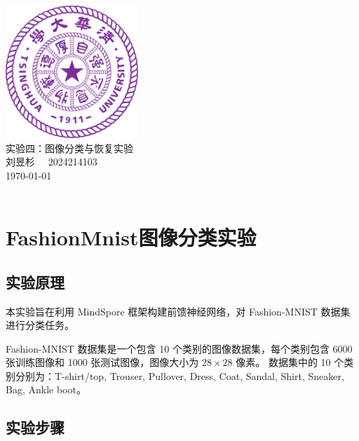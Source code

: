 \documentclass[12pt]{ctexart}
\begin{document}
\begin{titlepage}
    \begin{center}
        \includegraphics[width=5cm]{tsinghua_logo.png}\\[4cm]  %
        {\Huge 实验四：图像分类与恢复实验} \\[4cm]
        {\large 刘昱杉  \ \  2024214103}\\[6cm]
        {\normalsize \today}\\[1cm]
        \vfill
        \\

    \end{center}
\end{titlepage}

\section*{FashionMnist图像分类实验}

\subsection*{实验原理}

本实验旨在利用 MindSpore 框架构建前馈神经网络，对 Fashion-MNIST 数据集进行分类任务。

Fashion-MNIST 数据集是一个包含 10 个类别的图像数据集，每个类别包含 6000 张训练图像和 1000 张测试图像，图像大小为 $28 \times 28$ 像素。
数据集中的 10 个类别分别为：T-shirt/top, Trouser, Pullover, Dress, Coat, Sandal, Shirt, Sneaker, Bag, Ankle boot。

\subsection*{实验步骤}
\end{document}
